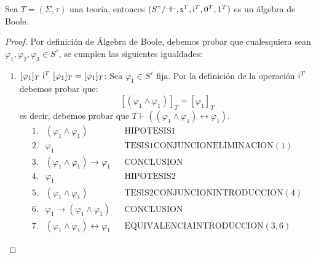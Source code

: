   \begin{lemma} \label{lemma_76}
    \PN Sea $T = (\Sigma, \tau)$ una teoría, entonces $(S^{\tau}/\mathrm{\dashv \vdash}, \mathsf{s}^{T}, \mathsf{i}^{T}, 0^{T},
    1^{T})$ es un álgebra de Boole.
  \end{lemma}
  \begin{proof}
    \PN Por definición de Álgebra de Boole, debemos probar que cualesquiera sean $\varphi_{1}, \varphi_{2}, \varphi_{3}
    \in S^{\tau}$, se cumplen las siguientes igualdades:
    \begin{enumerate}[(1)]
      \item $[\varphi_{1}]_{T} \ \IN^{T} \ [\varphi_{1}]_{T} = [\varphi_{1}]_{T}$: Sea $\varphi_{1} \in S^{\tau}$ fija.
        Por la definición de la operación $\mathsf{i}^{T}$ debemos probar que:
        \[
          [(\varphi_{1} \wedge \varphi_{1})]_{T} = [\varphi_{1}]_{T}
        \]
        \PN es decir, debemos probar que $T \vdash ((\varphi_{1} \wedge \varphi_{1}) \leftrightarrow \varphi_{1})$.
        \[
          \begin{array}{llll}
            1. & (\varphi_{1} \wedge \varphi_{1}) && \text{HIPOTESIS1} \\
            2. & \varphi_{1} && \text{TESIS1CONJUNCIONELIMINACION}(1) \\
            3. & (\varphi_{1} \wedge \varphi_{1}) \rightarrow \varphi_{1} && \text{CONCLUSION} \\
            4. & \varphi_{1} && \text{HIPOTESIS2} \\
            5. & (\varphi_{1} \wedge \varphi_{1}) && \text{TESIS2CONJUNCIONINTRODUCCION}(4) \\
            6. & \varphi_{1} \rightarrow (\varphi_{1} \wedge \varphi_{1}) && \text{CONCLUSION} \\
            7. & (\varphi_{1} \wedge \varphi_{1}) \leftrightarrow \varphi_{1} && \text{EQUIVALENCIAINTRODUCCION}(3,6)
          \end{array}
        \]


\end{enumerate}
\end{proof}
